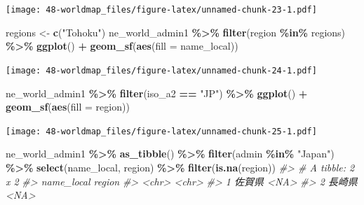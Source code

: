 \documentclass[
  xelatex, ja=standard]{bxjsbook}
\newenvironment{Shaded}{\begin{snugshade}}{\end{snugshade}}
\newcommand{\AttributeTok}[1]{\textcolor[rgb]{0.13,0.29,0.53}{#1}}
\newcommand{\CommentTok}[1]{\textcolor[rgb]{0.56,0.35,0.01}{\textit{#1}}}
\newcommand{\FunctionTok}[1]{\textcolor[rgb]{0.13,0.29,0.53}{\textbf{#1}}}
\newcommand{\NormalTok}[1]{#1}
\newcommand{\OtherTok}[1]{\textcolor[rgb]{0.56,0.35,0.01}{#1}}
\newcommand{\SpecialCharTok}[1]{\textcolor[rgb]{0.81,0.36,0.00}{\textbf{#1}}}
\newcommand{\StringTok}[1]{\textcolor[rgb]{0.31,0.60,0.02}{#1}}
\theoremstyle{definition}
\theoremstyle{definition}
\theoremstyle{definition}
\theoremstyle{definition}
\theoremstyle{remark}
\begin{document}
\texttt{[image: 48-worldmap\_files/figure-latex/unnamed-chunk-23-1.pdf]}

\begin{Shaded}
\begin{Highlighting}[]
\NormalTok{regions }\OtherTok{\textless{}{-}} \FunctionTok{c}\NormalTok{(}\StringTok{"Tohoku"}\NormalTok{)}
\NormalTok{ne\_world\_admin1 }\SpecialCharTok{\%\textgreater{}\%} \FunctionTok{filter}\NormalTok{(region }\SpecialCharTok{\%in\%}\NormalTok{ regions) }\SpecialCharTok{\%\textgreater{}\%} 
  \FunctionTok{ggplot}\NormalTok{() }\SpecialCharTok{+} \FunctionTok{geom\_sf}\NormalTok{(}\FunctionTok{aes}\NormalTok{(}\AttributeTok{fill =}\NormalTok{ name\_local))}
\end{Highlighting}
\end{Shaded}

\texttt{[image: 48-worldmap\_files/figure-latex/unnamed-chunk-24-1.pdf]}

\begin{Shaded}
\begin{Highlighting}[]
\NormalTok{ne\_world\_admin1 }\SpecialCharTok{\%\textgreater{}\%} \FunctionTok{filter}\NormalTok{(iso\_a2 }\SpecialCharTok{==} \StringTok{"JP"}\NormalTok{) }\SpecialCharTok{\%\textgreater{}\%}
  \FunctionTok{ggplot}\NormalTok{() }\SpecialCharTok{+}   \FunctionTok{geom\_sf}\NormalTok{(}\FunctionTok{aes}\NormalTok{(}\AttributeTok{fill =}\NormalTok{ region))}
\end{Highlighting}
\end{Shaded}

\texttt{[image: 48-worldmap\_files/figure-latex/unnamed-chunk-25-1.pdf]}

\begin{Shaded}
\begin{Highlighting}[]
\NormalTok{ne\_world\_admin1 }\SpecialCharTok{\%\textgreater{}\%} \FunctionTok{as\_tibble}\NormalTok{() }\SpecialCharTok{\%\textgreater{}\%} \FunctionTok{filter}\NormalTok{(admin }\SpecialCharTok{\%in\%} \StringTok{"Japan"}\NormalTok{) }\SpecialCharTok{\%\textgreater{}\%} 
  \FunctionTok{select}\NormalTok{(name\_local, region) }\SpecialCharTok{\%\textgreater{}\%} \FunctionTok{filter}\NormalTok{(}\FunctionTok{is.na}\NormalTok{(region))}
\CommentTok{\#\textgreater{} \# A tibble: 2 x 2}
\CommentTok{\#\textgreater{}   name\_local region}
\CommentTok{\#\textgreater{}   \textless{}chr\textgreater{}      \textless{}chr\textgreater{} }
\CommentTok{\#\textgreater{} 1 佐賀県     \textless{}NA\textgreater{}  }
\CommentTok{\#\textgreater{} 2 長崎県     \textless{}NA\textgreater{}}
\end{Highlighting}
\end{Shaded}
\end{document}
